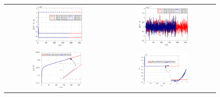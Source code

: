 \begin{figure}[hbtp]
	\centering
	\begin{tabular}{cc}
		\includegraphics[width=0.5\textwidth]{Figures/Example1/EnergyBalancePlots/Jv2.eps} &
		\includegraphics[width=0.5\textwidth]{Figures/Example1/EnergyBalancePlots/LinearMomentumv2.eps}\\
	\includegraphics[width=0.5\textwidth]{Figures/Example1/EnergyBalancePlots/EntropyFinalv2.eps} &
\includegraphics[width=0.5\textwidth]{Figures/Example1/EnergyBalancePlots/EnergyFinalv2.eps}\\

\end{tabular}
\end{figure}
